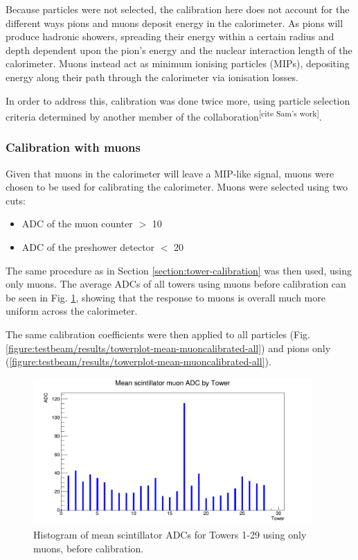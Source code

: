 Because particles were not selected, the calibration here does not account for the different ways pions and muons deposit energy in the calorimeter. As pions will produce hadronic showers, spreading their energy within a certain radius and depth dependent upon the pion's energy and the nuclear interaction length of the calorimeter. Muons instead act as minimum ionising particles (\acrshort{MIP}s), depositing energy along their path through the calorimeter via ionisation losses.

In order to address this, calibration was done twice more, using particle selection criteria determined by another member of the collaboration\textsuperscript{[cite Sam's work]}.

\subsubsection{Calibration with muons}
Given that muons in the calorimeter will leave a \acrshort{MIP}-like signal, muons were chosen to be used for calibrating the calorimeter. Muons were selected using two cuts: 

\begin{itemize}
	\item ADC of the muon counter $>$ 10
	\item ADC of the preshower detector $<$ 20
\end{itemize}

The same procedure as in Section \ref{section:tower-calibration} was then used, using only muons. The average ADCs of all towers using muons before calibration can be seen in Fig. \ref{figure:testbeam/results/towerplot-mean-uncalibrated-muons}, showing that the response to muons is overall much more uniform across the calorimeter.

The same calibration coefficients were then applied to all particles (Fig. \ref{figure:testbeam/results/towerplot-mean-muoncalibrated-all}) and pions only (\ref{figure:testbeam/results/towerplot-mean-muoncalibrated-all}). 

\begin{figure}[h]
	\centering
	\includegraphics[width=0.95\textwidth]{../Pictures/IDEA/Calibration/towerplot-scintillator-mean-uncalibrated-muons.png}
	\caption{Histogram of mean scintillator \acrshort{ADC}s for Towers 1-29 using only muons, before calibration.}
	\label{figure:testbeam/results/towerplot-mean-uncalibrated-muons}
\end{figure}

